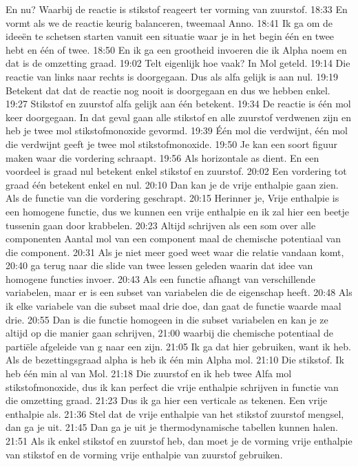 En nu? Waarbij de reactie is stikstof reageert ter vorming van zuurstof.
18:33
En vormt als we de reactie keurig balanceren, tweemaal Anno.
18:41
Ik ga om de ideeën te schetsen starten vanuit een situatie waar je in het begin één en twee hebt en één of twee.
18:50
En ik ga een grootheid invoeren die ik Alpha noem en dat is de omzetting graad.
19:02
Telt eigenlijk hoe vaak? In Mol geteld.
19:14
Die reactie van links naar rechts is doorgegaan. Dus als alfa gelijk is aan nul.
19:19
Betekent dat dat de reactie nog nooit is doorgegaan en dus we hebben enkel.
19:27
Stikstof en zuurstof alfa gelijk aan één betekent.
19:34
De reactie is één mol keer doorgegaan. In dat geval gaan alle stikstof en alle zuurstof verdwenen zijn en heb je twee mol stikstofmonoxide gevormd.
19:39
Één mol die verdwijnt, één mol die verdwijnt geeft je twee mol stikstofmonoxide.
19:50
Je kan een soort figuur maken waar die vordering schraapt.
19:56
Als horizontale as dient. En een voordeel is graad nul betekent enkel stikstof en zuurstof.
20:02
Een vordering tot graad één betekent enkel en nul.
20:10
Dan kan je de vrije enthalpie gaan zien. Als de functie van die vordering geschrapt.
20:15
Herinner je, Vrije enthalpie is een homogene functie, dus we kunnen een vrije enthalpie en ik zal hier een beetje tussenin gaan door krabbelen.
20:23
Altijd schrijven als een som over alle componenten Aantal mol van een component maal de chemische potentiaal van die component.
20:31
Als je niet meer goed weet waar die relatie vandaan komt,
20:40
ga terug naar die slide van twee lessen geleden waarin dat idee van homogene functies invoer.
20:43
Als een functie afhangt van verschillende variabelen, maar er is een subset van variabelen die de eigenschap heeft.
20:48
Als ik elke variabele van die subset maal drie doe, dan gaat de functie waarde maal drie.
20:55
Dan is die functie homogeen in die subset variabelen en kan je ze altijd op die manier gaan schrijven,
21:00
waarbij die chemische potentiaal de partiële afgeleide van g naar een zijn.
21:05
Ik ga dat hier gebruiken, want ik heb. Als de bezettingsgraad alpha is heb ik één min Alpha mol.
21:10
Die stikstof. Ik heb één min al van Mol.
21:18
Die zuurstof en ik heb twee Alfa mol stikstofmonoxide, dus ik kan perfect die vrije enthalpie schrijven in functie van die omzetting graad.
21:23
Dus ik ga hier een verticale as tekenen. Een vrije enthalpie als.
21:36
Stel dat de vrije enthalpie van het stikstof zuurstof mengsel, dan ga je uit.
21:45
Dan ga je uit je thermodynamische tabellen kunnen halen.
21:51
Als ik enkel stikstof en zuurstof heb, dan moet je de vorming vrije enthalpie van stikstof en de vorming vrije enthalpie van zuurstof gebruiken.
